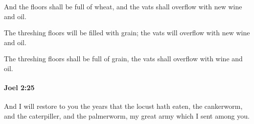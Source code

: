			\begin{versebox}
					\item[BHS] 
					\item[LXX] 
					\item[ASV] And the floors shall be full of wheat, and the vats shall overflow with new wine and oil.
					\item[NIV] The threshing floors will be filled with grain; the vats will overflow with new wine and oil.
					\item[NRSV] The threshing floors shall be full of grain, the vats shall overflow with wine and oil.
			\end{versebox}

		\paragraph{Joel 2:25} %
			\label{JOEL-2-25}

			And I will restore to you the years that the locust hath eaten, the cankerworm, and the caterpiller, and the palmerworm, my great army which I sent among you.

